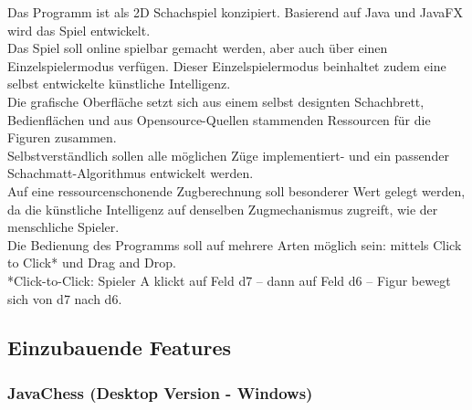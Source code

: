 \documentclass[12pt,a4paper]{article}
\begin{document}
Das Programm ist als 2D Schachspiel konzipiert. Basierend auf Java und JavaFX wird das Spiel entwickelt. \\
Das Spiel soll online spielbar gemacht werden, aber auch über einen Einzelspielermodus verfügen. Dieser Einzelspielermodus beinhaltet zudem eine selbst entwickelte künstliche Intelligenz. \\
Die grafische Oberfläche setzt sich aus einem selbst designten Schachbrett, Bedienflächen und aus Opensource-Quellen stammenden Ressourcen für die Figuren zusammen.\\
Selbstverständlich sollen alle möglichen Züge implementiert- und ein passender Schachmatt-Algorithmus entwickelt werden. \\
Auf eine ressourcenschonende Zugberechnung soll besonderer Wert gelegt werden, da die künstliche Intelligenz auf denselben Zugmechanismus zugreift, wie der menschliche Spieler. \\
Die Bedienung des Programms soll auf mehrere Arten möglich sein:  mittels Click to Click* und Drag and Drop.\\
*Click-to-Click: Spieler A klickt auf Feld d7 – dann auf Feld d6 – Figur bewegt sich von d7 nach d6.

\subsection{Einzubauende Features}

\subsubsection{JavaChess (Desktop Version - Windows)}
\end{document}
